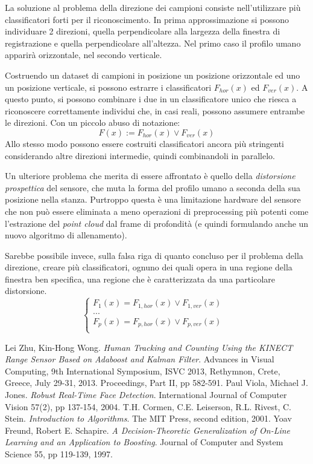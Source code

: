 \documentclass[a4paper,11pt,oneside]{article}
\begin{document}
		La soluzione al problema della direzione dei campioni consiste nell'utilizzare più classificatori forti per il riconoscimento. In prima approssimazione si possono individuare 2 direzioni, quella perpendicolare alla largezza della finestra di registrazione e quella perpendicolare all'altezza. Nel primo caso il profilo umano apparirà orizzontale, nel secondo verticale.

		Costruendo un dataset di campioni in posizione un posizione orizzontale ed uno un posizione verticale, si possono estrarre i classificatori $F_{hor}(x)$ ed $F_{ver}(x)$. A questo punto, si possono combinare i due in un classificatore unico che riesca a riconoscere correttamente individui che, in casi reali, possono assumere entrambe le direzioni. Con un piccolo abuso di notazione:
		$$F(x) := F_{hor}(x) \vee F_{ver}(x) $$
		Allo stesso modo possono essere costruiti classificatori ancora più stringenti considerando altre direzioni intermedie, quindi combinandoli in parallelo.

		Un ulteriore problema che merita di essere affrontato è quello della \emph{distorsione prospettica} del sensore, che muta la forma del profilo umano a seconda della sua posizione nella stanza. Purtroppo questa è una limitazione hardware del sensore che non può essere eliminata a meno operazioni di preprocessing più potenti come l'estrazione del \emph{point cloud} dal frame di profondità (e quindi formulando anche un nuovo algoritmo di allenamento).

		Sarebbe possibile invece, sulla falsa riga di quanto concluso per il problema della direzione, creare più classificatori, ognuno dei quali opera in una regione della finestra ben specifica, una regione che è caratterizzata da una particolare distorsione.
		\begin{equation}
			\begin{cases}
				F_1(x) = F_{1,hor}(x) \vee F_{1,ver}(x) & \\
				... & \\
				F_p(x) = F_{p,hor}(x) \vee F_{p,ver}(x) & \\
			\end{cases}
		\end{equation}


	\begin{thebibliography}{9}
		 Lei Zhu, Kin-Hong Wong. \emph{Human Tracking and Counting Using the KINECT Range Sensor Based on Adaboost and Kalman Filter}. Advances in Visual Computing, 9th International Symposium, ISVC 2013, Rethymnon, Crete, Greece, July 29-31, 2013. Proceedings, Part II, pp 582-591.
		 Paul Viola, Michael J. Jones. \emph{Robust Real-Time Face Detection}. International Journal of Computer Vision 57(2), pp 137-154, 2004.
		 T.H. Cormen, C.E. Leiserson, R.L. Rivest, C. Stein. \emph{Introduction to Algorithms}. The MIT Press, second edition, 2001.
		 Yoav Freund, Robert E. Schapire. \emph{A Decision-Theoretic Generalization of On-Line Learning and an Application to Boosting}. Journal of Computer and System Science 55, pp 119-139, 1997.
	\end{thebibliography}
\end{document}

